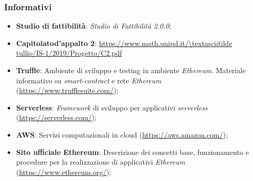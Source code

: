 \subsubsection{Informativi}
\begin{itemize}
	\item \textbf{Studio di fattibilità}: \textit{Studio di Fattibilità 2.0.0\docs};
    \item \textbf{Capitolato\glo d'appalto 2}: \url{https://www.math.unipd.it/\textasciitilde tullio/IS-1/2019/Progetto/C2.pdf}
	\item \textbf{Truffle}:  Ambiente di sviluppo e testing in ambiente \textit{Ethereum\glos}. Materiale informativo su \textit{smart-contract\glo} e rete \textit{Ethereum\glos} (\url{https://www.trufflesuite.com/});
	\item \textbf{Serverless\glos}:  \textit{Framework\glo} di sviluppo per applicativi \textit{serverless\glos} (\url{https://serverless.com/});
	\item \textbf{AWS}: Servizi computazionali in cloud (\url{https://aws.amazon.com/});
	\item \textbf{Sito ufficiale Ethereum\glos}: Descrizione dei concetti base, funzionamento e procedure per la realizzazione di applicativi \textit{Ethereum\glos} (\url {https://www.ethereum.org/});
\end{itemize}

	
	
	
